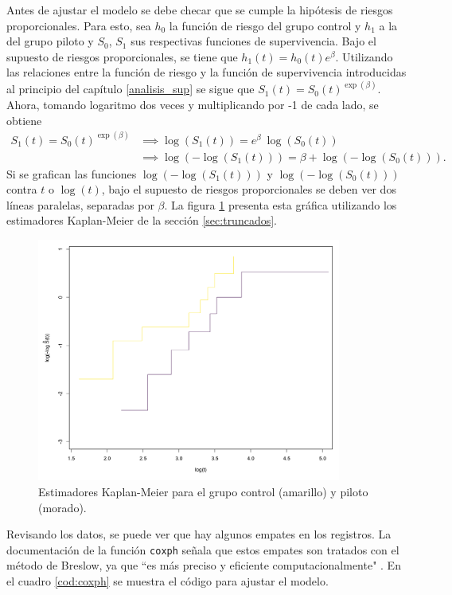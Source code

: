 \documentclass[11pt,a4paper]{article}
\begin{document}
Antes de ajustar el modelo se debe checar que se cumple la hipótesis de riesgos proporcionales. Para esto, sea $h_0$  la función de riesgo del grupo control y $h_1$ a la del grupo piloto y $S_0$, $S_1$ sus respectivas funciones de supervivencia. Bajo el supuesto de riesgos proporcionales, se tiene que $h_1(t) = h_0(t) e^\beta.$ Utilizando las relaciones entre la función de riesgo y la función de supervivencia introducidas al principio del capítulo \ref{analisis_sup} se sigue que $S_1(t) = S_0(t) ^ {\exp (\beta)}.$ Ahora, tomando logaritmo dos veces y multiplicando por -1 de cada lado, se obtiene
\begin{align*}
S_1(t) = S_0(t) ^ {\exp (\beta)} &\implies \log (S_1(t)) = e^\beta \ \log (S_0(t))\\
&\implies \log (-\log (S_1(t))) = \beta + \log (-\log (S_0(t))).
\end{align*}
Si se grafican las funciones $\log (-\log (S_1(t)))$ y $\log (-\log (S_0(t)))$ contra $t$ o $\log (t)$, bajo el supuesto de riesgos proporcionales se deben ver dos líneas paralelas, separadas por $\beta$. La figura \ref{fig:coxph} presenta esta gráfica utilizando los estimadores Kaplan-Meier de la sección \ref{sec:truncados}.

\begin{figure}[htb]
\centering\includegraphics[width=10cm]{prop_haz_km.png}
\caption{Estimadores Kaplan-Meier para el grupo control (amarillo) y piloto (morado). }
\label{fig:coxph}
\end{figure}

Revisando los datos, se puede ver que hay algunos empates en los registros. La documentación de la función \texttt{coxph} señala que estos empates son tratados con el método de Breslow, ya que ``es más preciso y eficiente computacionalmente" \citep{survival-book}. En el cuadro \ref{cod:coxph} se muestra el código para ajustar el modelo.
\end{document}

